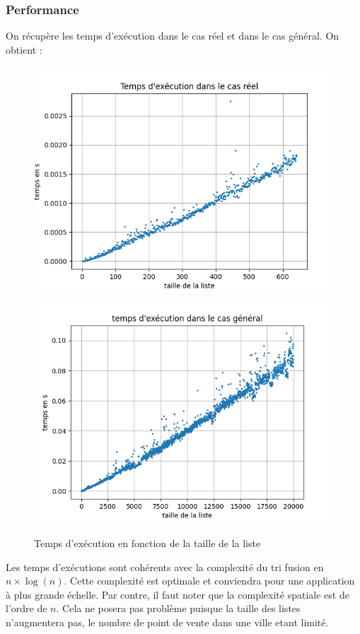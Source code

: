 \documentclass[11pt]{article}
\begin{document}
\subsubsection{Performance}
On récupère les temps d'exécution dans le cas réel et dans le cas général.
On obtient : 
\begin{figure}[h]
     \centering
     \includegraphics[scale=0.6]{tri_fusio_temps_reel.png}
     \centering
     \includegraphics[scale=0.6]{tri_cas_general.png}
     \caption{Temps d'exécution en fonction de la taille de la liste}
\end{figure}

Les temps d’exécutions sont cohérents avec la complexité du tri fusion en $n \times \log(n)$. Cette complexité est optimale et conviendra pour une application à plus grande échelle. Par contre, il faut noter que la complexité spatiale est de l'ordre de $n$. Cela ne posera pas problème puisque la taille des listes n'augmentera pas, le nombre de point de vente dans une ville etant limité.
\end{document}
